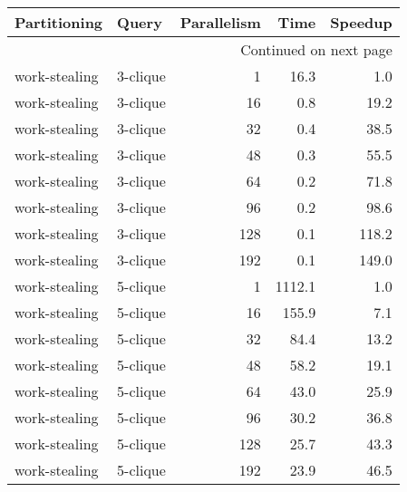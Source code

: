 \begin{longtable}{llr|rr}
\toprule
  Partitioning &     Query &  Parallelism &    Time &  Speedup \\
\midrule
\endhead
\midrule
\multicolumn{5}{r}{{Continued on next page}} \\
\midrule
\endfoot

\bottomrule
\endlastfoot
 work-stealing &  3-clique &            1 &    16.3 &      1.0 \\
 work-stealing &  3-clique &           16 &     0.8 &     19.2 \\
 work-stealing &  3-clique &           32 &     0.4 &     38.5 \\
 work-stealing &  3-clique &           48 &     0.3 &     55.5 \\
 work-stealing &  3-clique &           64 &     0.2 &     71.8 \\
 work-stealing &  3-clique &           96 &     0.2 &     98.6 \\
 work-stealing &  3-clique &          128 &     0.1 &    118.2 \\
 work-stealing &  3-clique &          192 &     0.1 &    149.0 \\
 work-stealing &  5-clique &            1 &  1112.1 &      1.0 \\
 work-stealing &  5-clique &           16 &   155.9 &      7.1 \\
 work-stealing &  5-clique &           32 &    84.4 &     13.2 \\
 work-stealing &  5-clique &           48 &    58.2 &     19.1 \\
 work-stealing &  5-clique &           64 &    43.0 &     25.9 \\
 work-stealing &  5-clique &           96 &    30.2 &     36.8 \\
 work-stealing &  5-clique &          128 &    25.7 &     43.3 \\
 work-stealing &  5-clique &          192 &    23.9 &     46.5 \\
\end{longtable}
